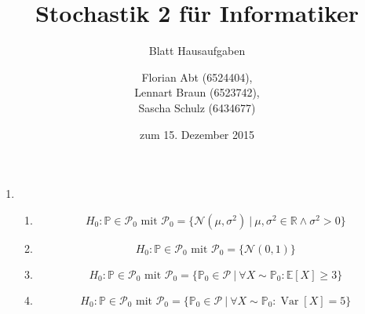 \documentclass[a4paper]{scrartcl}
\title{Stochastik 2 für Informatiker}
\subtitle{Blatt {\blattnr} Hausaufgaben}
\author{
    Florian Abt (6524404), \\
    Lennart Braun (6523742), \\
    Sascha Schulz (6434677)
}
\date{zum 15. Dezember 2015}
\newcommand{\dif}{\ \mathrm{d}}
\newcommand{\prob}{\mathbb{P}}
\newcommand{\e}{\mathbb{E}}
\newcommand{\var}{\operatorname{Var}}
\def \blattnr {9}
\begin{document}
\maketitle

\begin{enumerate}[label=\bfseries \blattnr.\arabic*]
    \item
        \begin{enumerate}
            \item
                \begin{equation*}
                    H_0: \mathbb{P} \in \mathcal{P}_0 \text{ mit }
                    \mathcal{P}_0 =
                    \{ \mathcal{N}(\mu,\sigma^2) \ |\ 
                    \mu,\sigma^2 \in \mathbb{R} \land \sigma^2 > 0 \}
                \end{equation*}

            \item 
                \begin{equation*}
                    H_0: \mathbb{P} \in \mathcal{P}_0 \text{ mit }
                    \mathcal{P}_0 =
                    \{ \mathcal{N}(0,1) \}
                \end{equation*}

            \item 

                \begin{equation*}
                    H_0: \mathbb{P} \in \mathcal{P}_0 \text{ mit }
                    \mathcal{P}_0 =
                    \{ \prob_0 \in \mathcal{P}\ |\ 
                    \forall X \sim \prob_0 : \e[X] \geq 3 \}
                \end{equation*}

           \item 
                \begin{equation*}
                    H_0: \mathbb{P} \in \mathcal{P}_0 \text{ mit }
                    \mathcal{P}_0 =
                    \{ \prob_0 \in \mathcal{P}\ |\ 
                    \forall X \sim \prob_0 : \var[X] = 5 \}
                \end{equation*}
      \end{enumerate}


\end{enumerate}
\end{document}
